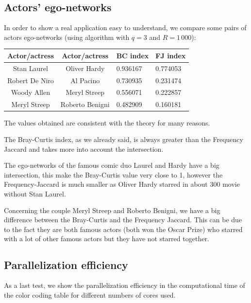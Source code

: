 \subsection*{Actors' ego-networks}

In order to show a real application easy to understand, we compare
some pairs of actors ego-networks (using \fcount algorithm with $q=3$ and $R=1\,000$):\medskip

\begin{table}[h]
	\centering
	\begin{tabular}{c|c|l|l}
		Actor/actress  & Actor/actress   & BC index & FJ index \\ 
		\hline
		Stan Laurel    & Oliver Hardy    & 0.936167 & 0.774053 \\
		Robert De Niro & Al Pacino       & 0.730935 & 0.231474 \\
		Woody Allen    & Meryl Streep    & 0.556071 & 0.222857 \\
		Meryl Streep   & Roberto Benigni & 0.482909 & 0.160181 \\
	\end{tabular}
\end{table}

\medskip

The values obtained are consistent with the theory for many reasons. \medskip

The Bray-Curtis index, as we already said, is always greater than the Frequency Jaccard and takes more into account the intersection.

The ego-networks of the famous comic duo Laurel and Hardy have a big intersection, this make the Bray-Curtis value very close to 1, however the Frequency-Jaccard is much smaller as Oliver Hardy starred in about $300$ movie without Stan Laurel.

Concerning the couple Meryl Streep and Roberto Benigni, we have a big difference between the Bray-Curtis and the Frequency Jaccard. This can be due to the fact they are both famous actors (both won the Oscar Prize) who starred with a lot of other famous actors but they have not starred together.

\subsection*{Parallelization efficiency}

As a last test, we show the parallelization efficiency in the computational time of the color coding table for different numbers of cores used.

